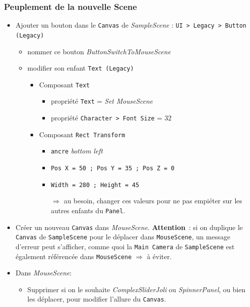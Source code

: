 \documentclass[a4paper,10pt]{article}
\newenvironment{solution}%
{\begin{tcolorbox}[breakable,colback=red!5!white,colframe=red!75!black,title=Solution]}%
{\end{tcolorbox}}
\begin{document}
\begin{solution}
\subsubsection{Peuplement de la nouvelle Scene}
\begin{itemize}	
	\item  Ajouter un bouton dans le \texttt{Canvas} de \textit{SampleScene} : \texttt{UI > Legacy > Button (Legacy)}
	\begin{itemize}
		\item nommer ce bouton \textit{ButtonSwitchToMouseScene}
		\item modifier son enfant \texttt{Text (Legacy)}
		\begin{itemize}
			\item Composant \texttt{Text}
			\begin{itemize}
				\item propriété \texttt{Text} = \textit{Set MouseScene}
				\item  propriété \texttt{Character > Font Size} = $32$
			\end{itemize}	
			\item Composant \texttt{Rect Transform}
			\begin{itemize}
				\item \texttt{ancre} \textit{bottom left}
				\item \texttt{Pos X = 50 ; Pos Y = 35 ; Pos Z = 0}
				\item 	\texttt{Width = 280 ; Height = 45}
				\item[$\Rightarrow$] au besoin, changer ces valeurs pour ne pas empiéter sur les autres enfants du \texttt{Panel}.
			\end{itemize}	
		\end{itemize}
	\end{itemize}

	\item Créer un nouveau \texttt{Canvas} dans \textit{MouseScene}. \textbf{Attention}~: si on duplique le \texttt{Canvas} de \texttt{SampleScene} pour le déplacer dans \texttt{MouseScene}, un message d'erreur peut s'afficher, comme quoi la \texttt{Main~Camera} de \texttt{SampleScene} est également référencée dans \texttt{MouseScene} $\Rightarrow$ à éviter.
	
	\item Dans \textit{MouseScene}:
	\begin{itemize}
		\item Supprimer si on le souhaite \textit{ComplexSliderJoli} ou \textit{SpinnerPanel}, ou bien les déplacer, pour modifier l'allure du \texttt{Canvas}.
	

\end{itemize}
\end{itemize}
\end{solution}
\end{document}
